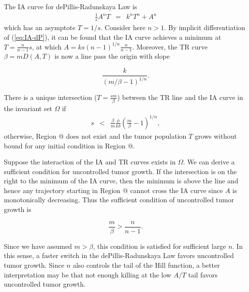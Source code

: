 \documentclass[review,authoryear]{elsarticle}
\makeatletter
\newcommand*{\rom}[1]{\expandafter\@slowromancap\romannumeral #1@}
\makeatother
\begin{document}
 The IA curve for dePillis-Radunskaya Law is
\begin{eqnarray}
\frac{1}{s}A^{n}T & = & k^{n}T^{n}+A^{n}\label{eq:IA-dP}
\end{eqnarray}
which has an asymptote $T=1/s$. Consider here $n>1$. 
By implicit differentiation of (\ref{eq:IA-dP}), it can be found
that the IA curve achieves a minimum at $T=\frac{n}{n-1}s$, at which
$A=ks(n-1)^{1/n}\frac{n}{n-1}$. Moreover, the TR curve
$\beta=mD(A,T)$ is now a line pass the origin with slope 
\begin{linenomath*}
\[
\frac{k}{(m/\beta-1)^{1/n}}.
\]
\end{linenomath*}
There is a unique intersection ($T=\frac{sm}{\beta}$) between the
TR line and the IA curve in the invariant set $\Omega$ if 
\begin{eqnarray}
s & < & \frac{\beta}{m}\frac{\phi}{k\delta}(\frac{m}{\beta}-1)^{1/n},\label{eq:s<}
\end{eqnarray}
  otherwise, Region \rom{3} does not exist and the tumor population $T$ grows
without bound for any initial condition in Region \rom{2}. 

Suppose the interaction of the IA and TR curves exists in $\Omega$. We can derive
a sufficient condition for uncontrolled tumor growth. If the intersection
is on the right to the minimum of the IA curve, then the minimum is above the line
and hence any trajectory starting in Region \rom{2} cannot cross the IA curve
since $A$ is monotonically decreasing. Thus the sufficient condition
of uncontrolled tumor growth is 
\begin{linenomath*}
\begin{equation}
\frac{m}{\beta}>\frac{n}{n-1}.\label{eq:sneak-thru-cond}
\end{equation}
\end{linenomath*}
Since we have assumed $m>\beta$, this condition is satisfied for sufficient large $n$. In this sense, a faster switch in the dePillis-Radunskaya
Law favors uncontrolled tumor growth. Since $n$ also controls the tail of the Hill function, a better  interpretation may be that
not enough killing at the low $A/T$ tail favors uncontrolled tumor growth. 
\end{document}

